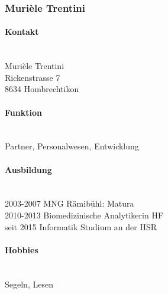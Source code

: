 \subsubsection{Murièle Trentini}
\noindent\begin{minipage}{0.7\textwidth}
	\paragraph{Kontakt} \hfill \\
	Murièle Trentini \\
	Rickenstrasse 7 \\
	8634 Hombrechtikon \\
	
	\paragraph{Funktion} \hfill \\
	Partner, Personalwesen, Entwicklung \\
	
	\paragraph{Ausbildung} \hfill \\
	2003-2007 \hspace{1cm} MNG Rämibühl: Matura \\
	2010-2013 \hspace{1cm} Biomedizinische Analytikerin HF \\
	seit 2015\hspace{1.35cm} Informatik Studium an der HSR\\
	
	\paragraph{Hobbies} \hfill \\
	Segeln, Lesen \\
\end{minipage}
\hfill

